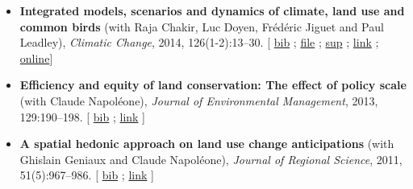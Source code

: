 \documentclass[12pt, a4paper]{./style}
\begin{document}
\begin{itemize}
; \href{http://www.ceps.be/book/empirical-content-present-value-model-survey-instrumental-uses-farmland-prices.html}{wp} ]
\item \textbf{Integrated models, scenarios and dynamics of climate,
land use and common birds} (with Raja Chakir, Luc
Doyen, Frédéric Jiguet and Paul Leadley), \emph{Climatic
Change}, 2014, 126(1-2):13--30. [ \href{bib/CILE.bib}{bib} ; \href{doc/CILE-FILE.pdf}{file} ; \href{doc/CILE-SUP.pdf}{sup} ;
\href{https://link.springer.com/article/10.1007/s10584-014-1202-4}{link} ; \href{https://mobilis-a4ac2.firebaseapp.com/index.html}{online}]
\item \textbf{Efficiency and equity of land conservation: The effect
of policy scale} (with Claude Napoléone), \emph{Journal of
Environmental Management}, 2013, 129:190--198. [ \href{bib/EELC.bib}{bib} ;
\href{http://www.sciencedirect.com/science/article/pii/S0301479713004829}{link} ]
\item \textbf{A spatial hedonic approach on land use change
anticipations} (with Ghislain Geniaux and Claude
Napoléone), \emph{Journal of Regional Science}, 2011,
51(5):967--986. [ \href{bib/SPHED.bib}{bib} ; \href{http://onlinelibrary.wiley.com/doi/10.1111/j.1467-9787.2011.00721.x/abstract}{link} ]
\end{itemize}
\label{sec:org8c9d005}
\end{document}
